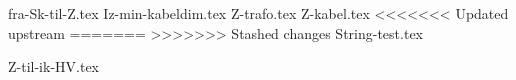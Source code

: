 \usepackage[utf8]{inputenc}%
\usepackage{amsmath}%
\usepackage{mathtools}%
\usepackage{icomma}%
\usepackage{siunitx}%
\usepackage{fp}%
\usepackage{xstring}%
\usepackage{import}
\usepackage{listofitems}
\usepackage{ifthen}


{fra-Sk-til-Z.tex}
{Iz-min-kabeldim.tex}
{Z-trafo.tex}
{Z-kabel.tex}
<<<<<<< Updated upstream
=======
>>>>>>> Stashed changes
{String-test.tex}

{Z-til-ik-HV.tex}